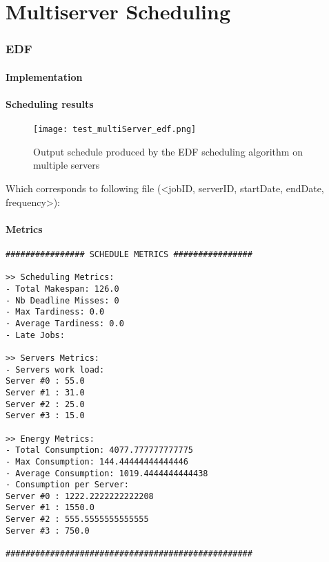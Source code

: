 \documentclass[./report.tex]{subfiles}
\begin{document}
\part{Multiserver Scheduling}

\section{EDF}
\subsection{Implementation}

\newpage
\subsection{Scheduling results}
\begin{figure}[!h]
	\center
	\texttt{[image: test\_multiServer\_edf.png]}
	\caption{Output schedule produced by the EDF scheduling algorithm on multiple servers}
	\label{fig:multiServer_edf} 
\end{figure}

Which corresponds to following file (<jobID, serverID, startDate, endDate, frequency>):


\newpage
\subsection{Metrics}
\begin{lstlisting}[style=txt, caption={Metrics for EDF on multiple servers}]
################ SCHEDULE METRICS ################

>> Scheduling Metrics: 
- Total Makespan: 126.0
- Nb Deadline Misses: 0
- Max Tardiness: 0.0
- Average Tardiness: 0.0
- Late Jobs: 

>> Servers Metrics: 
- Servers work load:
Server #0 : 55.0
Server #1 : 31.0
Server #2 : 25.0
Server #3 : 15.0

>> Energy Metrics: 
- Total Consumption: 4077.777777777775
- Max Consumption: 144.44444444444446
- Average Consumption: 1019.4444444444438
- Consumption per Server: 
Server #0 : 1222.2222222222208
Server #1 : 1550.0
Server #2 : 555.5555555555555
Server #3 : 750.0

##################################################
\end{lstlisting}
\end{document}
